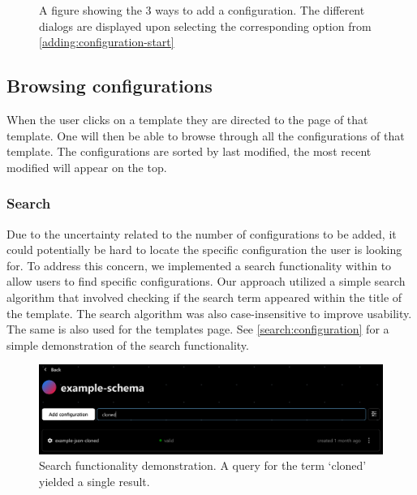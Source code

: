 \begin{figure}[!ht]
\begin{minipage}{0.275\textwidth}
   \end{minipage}
   \caption[Three ways to add a configuration]{A figure showing the 3 ways to add a configuration. The different dialogs are displayed upon selecting the corresponding option from \autoref{adding:configuration-start}
   }
   \label{adding:configuration}
\end{figure}

\subsection{Browsing configurations}

When the user clicks on a template they are directed to the page of that template. One will then be able to browse through all the configurations of that template. The configurations are sorted by last modified, the most recent modified will appear on the top.

\subsubsection{Search}

Due to the uncertainty related to the number of configurations to be added, it could potentially be hard to locate the specific configuration the user is looking for. To address this concern, we implemented a search functionality within to allow users to find specific configurations. Our approach utilized a simple search algorithm that involved checking if the search term appeared within the title of the template. The search algorithm was also case-insensitive to improve usability. The same is also used for the templates page. See \autoref{search:configuration} for a simple demonstration of the search functionality.

\begin{figure}[!ht]
   \begin{minipage}{1\textwidth}
    \centering
    \includegraphics[width=.85\textwidth]{Figures/configurations-page/search-crop.pdf}
     \caption[Configuration search demo]{Search functionality demonstration. A query for the term ‘cloned’ yielded a single result.}
     \label{search:configuration}
   \end{minipage}\hfill
\end{figure}

